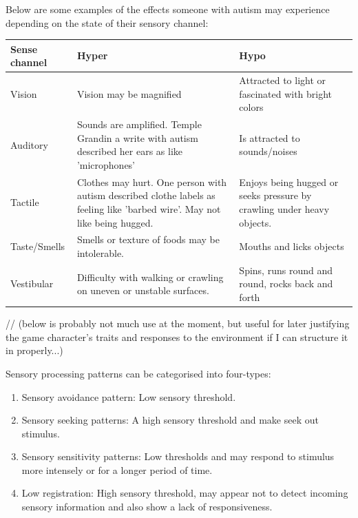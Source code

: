 \documentclass[11pt]{report}
\begin{document}
Below are some examples of the effects someone with autism may experience depending on the state of their sensory channel:

\begin{table}
    \begin{tabular}{| l | p{5cm} | p{5cm} |}
    \hline
    Sense channel & Hyper                                                                                                                      & Hypo                                                                   \\
    \hline
    \hline
    Vision        & Vision may be magnified                                                                                                    & Attracted to light or fascinated with bright colors                    \\
    \hline
    Auditory      & Sounds are amplified. Temple Grandin a write with autism described her ears as like 'microphones'                          & Is attracted to sounds/noises                                          \\
    \hline
    Tactile       & Clothes may hurt. One person with autism described clothe labels as feeling like 'barbed wire'. May not like being hugged. & Enjoys being hugged or seeks pressure by crawling under heavy objects. \\
    \hline
    Taste/Smells & Smells or texture of foods may be intolerable. & Mouths and licks objects \\
    \hline
    Vestibular & Difficulty with walking or crawling on uneven or unstable surfaces. & Spins, runs round and round, rocks back and forth \\
    \hline
    \end{tabular}
\end{table}

// (below is probably not much use at the moment, but useful for later justifying the game character's traits and responses to the environment if I can structure it in properly...)

Sensory processing patterns can be categorised into four-types\cite{sensory_leisure}:

\begin{enumerate}
\item Sensory avoidance pattern: Low sensory threshold. 
\item Sensory seeking patterns: A high sensory threshold and make seek out stimulus.
\item Sensory sensitivity patterns: Low thresholds and may respond to stimulus more intensely or for a longer period of time.
\item Low registration: High sensory threshold, may appear not to detect incoming sensory information and also show a lack of responsiveness.
\end{enumerate}
\end{document}
